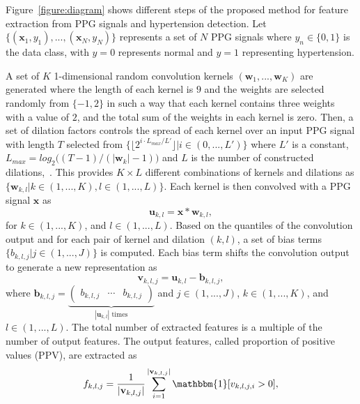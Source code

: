\documentclass[letterpaper, 10 pt, conference]{ieeeconf}
\begin{document}
Figure~\ref{figure:diagram} shows different steps of the proposed method for feature extraction from PPG signals and hypertension detection. Let $\{(\mathbf{x}_1,y_1),...,(\mathbf{x}_N,y_N)\}$ represents a set of $N$ PPG signals where $y_n\in\{0,1\}$ is the data class, with $y=0$ represents normal and $y=1$ representing hypertension. 


A set of $K$ 1-dimensional random convolution kernels $(\mathbf{w}_1,...,\mathbf{w}_K)$ are generated where the length of each kernel is $9$ and the weights are selected randomly from $\{-1,2\}$ in such a way that each kernel contains three weights with a value of $2$, and the total sum of the weights in each kernel is zero. Then, a set of dilation factors controls the spread of each kernel over an input PPG signal with length $T$ selected from ${\{\lfloor2^{i\cdot L_{max}/L'}\rfloor|i\in(0,...,L')\}}$ where $L'$ is a constant, $L_{max}=log_2\big((T-1)/(|\mathbf{w}_k|-1)\big)$ and $L$ is the number of constructed dilations,~\cite{dempster2021MiniROCKET,salehinejad2023joint}. 
This provides $K\times L$ different combinations of kernels and dilations as ${\{\mathbf{w}_{k,l}|k\in(1,...,K),l\in(1,...,L)\}}$. 
Each kernel is then convolved with a PPG signal $\mathbf{x}$ as
\begin{equation}
    \mathbf{u}_{k,l} = \mathbf{x}*\mathbf{w}_{k,l},
\end{equation}
for $k\in(1,...,K)$, and $l\in(1,...,L)$. 
Based on the quantiles of the convolution output and for each pair of kernel and dilation $(k,l)$, a set of bias terms $\{b_{k,l,j}|j\in(1,...,J)\}$ is computed. Each bias term shifts the convolution output to generate a new representation as  
\begin{equation}
    \mathbf{v}_{k,l,j}= \mathbf{u}_{k,l} - \mathbf{b}_{k,l,j},
    \label{eq:bias}
\end{equation}
where $\mathbf{b}_{k,l,j} = \underbrace{\begin{pmatrix}
            b_{k,l,j} & \cdots & b_{k,l,j}
        \end{pmatrix}}_{|\mathbf{u}_{k,l}| \text{ times}}$ and $j\in(1,...,J)$, ${k\in(1,...,K)}$, and $l\in(1,...,L)$. The total number of extracted features is a multiple of the number of output features. The output features, called proportion of positive values (PPV), are extracted as
\begin{equation}
    f_{k,l,j}=\frac{1}{|\mathbf{v}_{k,l,j}|}\sum_{i=1}^{|\mathbf{v}_{k,l,j}|}\mathbbm{1}[v_{k,l,j,i}>0],
    \label{eq:ppv}
\end{equation}
\end{document}
